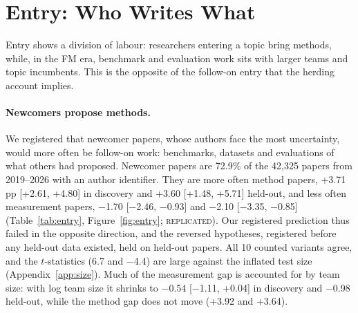 \documentclass[11pt]{article}
\newcommand{\lab}[1]{\textsc{#1}}
\begin{document}
\section{Entry: Who Writes What}
\label{sec:entry}

Entry shows a division of labour: researchers entering a topic bring methods, while, in the FM era, benchmark and
evaluation work sits with larger teams and topic incumbents. This is the opposite of the follow-on entry that the herding account implies.

\paragraph{Newcomers propose methods.}
We registered that newcomer papers, whose authors face the most uncertainty, would more often be follow-on work: benchmarks, datasets and evaluations of what others had proposed. Newcomer papers are 72.9\% of the 42,325 papers from 2019--2026 with an author
identifier. They are more often method
papers, +3.71\,pp [+2.61, +4.80] in discovery and +3.60 [+1.48, +5.71] held-out, and less often measurement papers,
$-$1.70 [$-$2.46, $-$0.93] and $-$2.10 [$-$3.35, $-$0.85] (Table~\ref{tab:entry}, Figure~\ref{fig:entry};
\lab{replicated}). Our registered prediction thus failed in the opposite direction, and the reversed hypotheses,
registered before any held-out data existed, held on held-out papers. All 10 counted variants agree, and the
$t$-statistics (6.7 and $-$4.4) are large against the inflated test size (Appendix~\ref{app:size}). Much of the
measurement gap is accounted for by team size: with log team size it shrinks to $-$0.54 [$-$1.11, +0.04] in discovery and $-$0.98
held-out, while the method gap does not move (+3.92 and +3.64).
\end{document}
